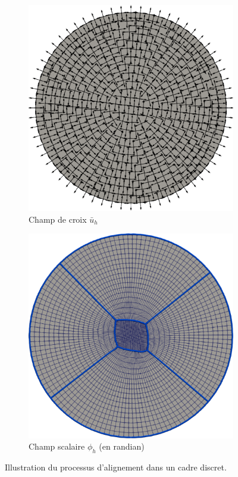 \begin{figure}[h!]
\centering
\begin{subfigure}{0.5\textwidth}
    \includegraphics[width=\textwidth]{images/non_homo_cross_field.pdf}
    \caption{Champ de croix $\bar{u}_h$}
    \label{fig:non_homogene_cross_field}
\end{subfigure}
\hfill
\begin{subfigure}{0.5\textwidth}
    \includegraphics[width=\textwidth]{images/non_homo_mesh_quad.pdf}
    \caption{Champ scalaire $\phi_h$ (en randian)}
    \label{fig:non_homogene_mesh_quad}
\end{subfigure}
\caption{Illustration du processus d'alignement dans un cadre discret.}
\label{fig:non_homogene}
\end{figure}
